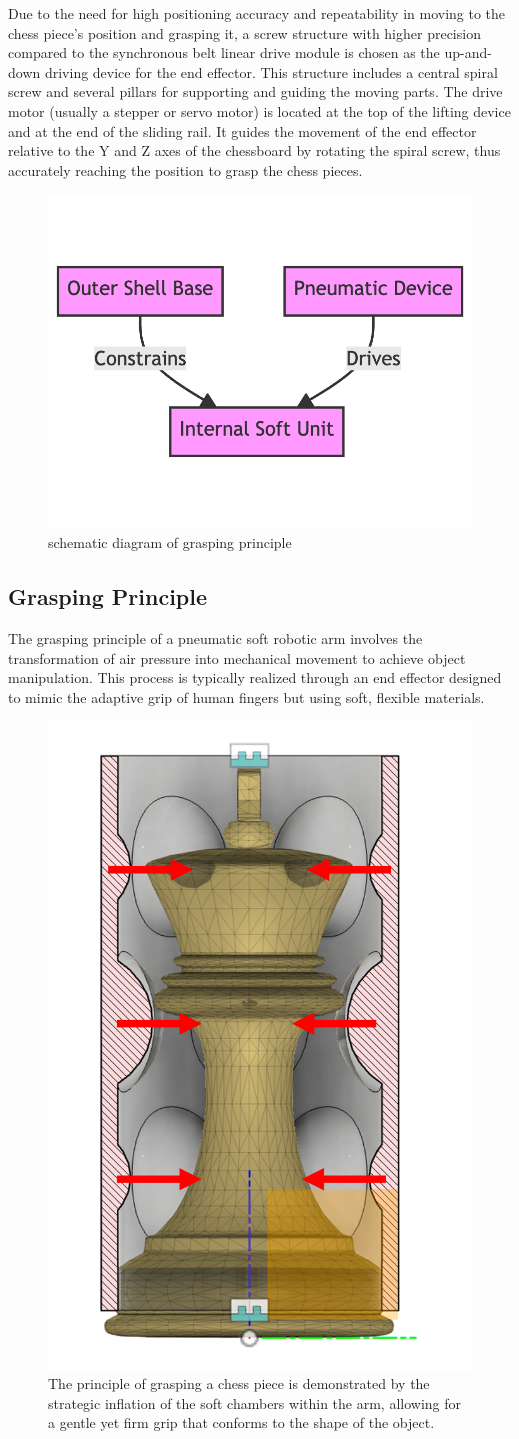 \documentclass[10pt, a4paper, twocolumn]{article}
\begin{document}
Due to the need for high positioning accuracy and repeatability in moving to the chess piece's position and grasping it, a screw structure with higher precision compared to the synchronous belt linear drive module is chosen as the up-and-down driving device for the end effector. This structure includes a central spiral screw and several pillars for supporting and guiding the moving parts. The drive motor (usually a stepper or servo motor) is located at the top of the lifting device and at the end of the sliding rail. It guides the movement of the end effector relative to the Y and Z axes of the chessboard by rotating the spiral screw, thus accurately reaching the position to grasp the chess pieces.

\begin{figure}
    \centering
    \includegraphics[width=0.6\linewidth]{grasping principle.png}
    \caption{schematic diagram of grasping principle}
    \label{fig:grasping principle}
\end{figure}

\subsection{Grasping Principle}
The grasping principle of a pneumatic soft robotic arm involves the transformation of air pressure into mechanical movement to achieve object manipulation. This process is typically realized through an end effector designed to mimic the adaptive grip of human fingers but using soft, flexible materials.

\begin{figure}[H]
\centering
\includegraphics[width=0.3\linewidth]{grasping chess.png}
\caption{The principle of grasping a chess piece is demonstrated by the strategic inflation of the soft chambers within the arm, allowing for a gentle yet firm grip that conforms to the shape of the object.}
\label{fig:grasping_chess}
\end{figure}
\end{document}
